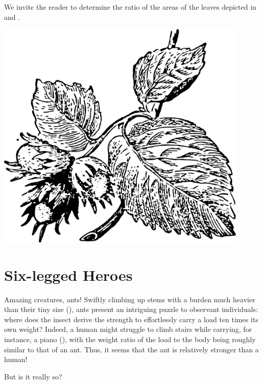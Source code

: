 \ques  We invite the reader to determine the ratio of the areas of the leaves depicted in  and .

\begin{marginfigure}[-4.5cm]%
\centering
\includegraphics[width=0.9\textwidth]{figures/ch-01/fig-01-23.pdf}
\end{marginfigure}



\section{Six-legged Heroes}
\label{sec-1.14}

Amazing creatures, ants! Swiftly climbing up stems with a burden much heavier than their tiny size (), ants present an intriguing puzzle to observant individuals: where does the insect derive the strength to effortlessly carry a load ten times its own weight? Indeed, a human might struggle to climb stairs while carrying, for instance, a piano (), with the weight ratio of the load to the body being roughly similar to that of an ant. Thus, it seems that the ant is relatively stronger than a human!

But is it really so?


